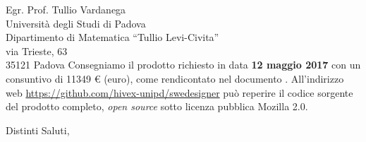\documentclass[a4paper]{letter} %
\begin{document}
\begin{letter}{Egr. Prof. Tullio Vardanega\\
Università degli Studi di Padova\\
Dipartimento di Matematica “Tullio Levi-Civita”\\
via Trieste, 63\\
35121 Padova}
Consegniamo il prodotto richiesto in data \textbf{12 maggio 2017} con un consuntivo di \num{11349} \euro{} (euro), come rendicontato nel documento \PdP. All'indirizzo web \url{https://github.com/hivex-unipd/swedesigner} può reperire il codice sorgente del prodotto completo, \emph{open source} sotto licenza pubblica Mozilla 2.0.

\closing{Distinti Saluti,}

\end{letter}
\end{document}
